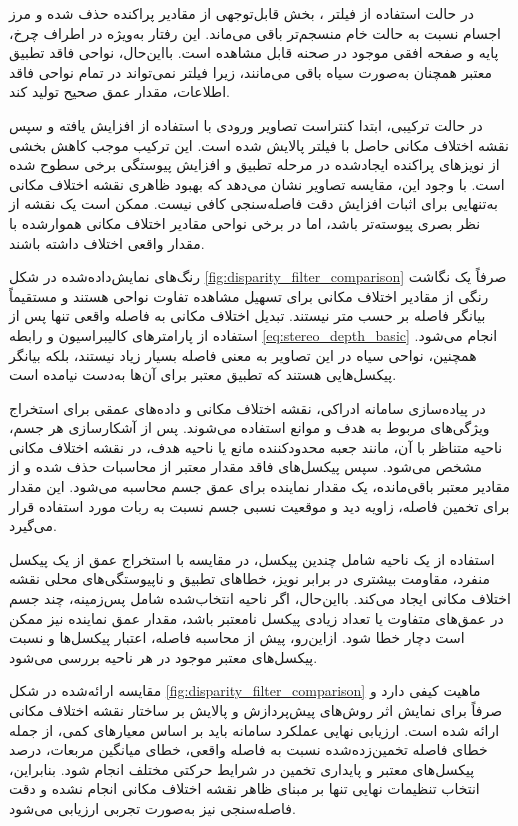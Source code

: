 در حالت استفاده از فیلتر ، بخش قابل‌توجهی از مقادیر
پراکنده حذف شده و مرز اجسام نسبت به حالت خام منسجم‌تر باقی می‌ماند.
این رفتار به‌ویژه در اطراف چرخ، پایه و صفحه افقی موجود در صحنه
قابل مشاهده است. بااین‌حال، نواحی فاقد تطبیق معتبر همچنان به‌صورت
سیاه باقی می‌مانند، زیرا فیلتر  نمی‌تواند در تمام نواحی
فاقد اطلاعات، مقدار عمق صحیح تولید کند.

در حالت ترکیبی، ابتدا کنتراست تصاویر ورودی با استفاده از
 افزایش یافته و سپس نقشه اختلاف مکانی حاصل با فیلتر
 پالایش شده است. این ترکیب موجب کاهش بخشی از نویزهای
پراکنده ایجادشده در مرحله تطبیق و افزایش پیوستگی برخی سطوح شده
است. با وجود این، مقایسه تصاویر نشان می‌دهد که بهبود ظاهری نقشه
اختلاف مکانی به‌تنهایی برای اثبات افزایش دقت فاصله‌سنجی کافی نیست.
ممکن است یک نقشه از نظر بصری پیوسته‌تر باشد، اما در برخی نواحی
مقادیر اختلاف مکانی هموارشده با مقدار واقعی اختلاف داشته باشند.

رنگ‌های نمایش‌داده‌شده در شکل
\ref{fig:disparity_filter_comparison} صرفاً یک نگاشت رنگی از مقادیر
اختلاف مکانی برای تسهیل مشاهده تفاوت نواحی هستند و مستقیماً بیانگر
فاصله بر حسب متر نیستند. تبدیل اختلاف مکانی به فاصله واقعی تنها پس
از استفاده از پارامترهای کالیبراسیون و رابطه
\ref{eq:stereo_depth_basic} انجام می‌شود. همچنین، نواحی سیاه در
این تصاویر به معنی فاصله بسیار زیاد نیستند، بلکه بیانگر پیکسل‌هایی
هستند که تطبیق معتبر برای آن‌ها به‌دست نیامده است.

در پیاده‌سازی سامانه ادراکی، نقشه اختلاف مکانی و داده‌های عمقی
برای استخراج ویژگی‌های مربوط به هدف و موانع استفاده می‌شوند. پس
از آشکارسازی هر جسم، ناحیه متناظر با آن، مانند جعبه محدودکننده
مانع یا ناحیه هدف، در نقشه اختلاف مکانی مشخص می‌شود. سپس پیکسل‌های
فاقد مقدار معتبر از محاسبات حذف شده و از مقادیر معتبر باقی‌مانده،
یک مقدار نماینده برای عمق جسم محاسبه می‌شود. این مقدار برای تخمین
فاصله، زاویه دید و موقعیت نسبی جسم نسبت به ربات مورد استفاده قرار
می‌گیرد.

استفاده از یک ناحیه شامل چندین پیکسل، در مقایسه با استخراج عمق از
یک پیکسل منفرد، مقاومت بیشتری در برابر نویز، خطاهای تطبیق و
ناپیوستگی‌های محلی نقشه اختلاف مکانی ایجاد می‌کند. بااین‌حال، اگر
ناحیه انتخاب‌شده شامل پس‌زمینه، چند جسم در عمق‌های متفاوت یا تعداد
زیادی پیکسل نامعتبر باشد، مقدار عمق نماینده نیز ممکن است دچار خطا
شود. ازاین‌رو، پیش از محاسبه فاصله، اعتبار پیکسل‌ها و نسبت پیکسل‌های
معتبر موجود در هر ناحیه بررسی می‌شود.

مقایسه ارائه‌شده در شکل \ref{fig:disparity_filter_comparison} ماهیت
کیفی دارد و صرفاً برای نمایش اثر روش‌های پیش‌پردازش و پالایش بر
ساختار نقشه اختلاف مکانی ارائه شده است. ارزیابی نهایی عملکرد
سامانه باید بر اساس معیارهای کمی، از جمله خطای فاصله تخمین‌زده‌شده
نسبت به فاصله واقعی، خطای میانگین مربعات، درصد پیکسل‌های معتبر و
پایداری تخمین در شرایط حرکتی مختلف انجام شود. بنابراین، انتخاب
تنظیمات نهایی تنها بر مبنای ظاهر نقشه اختلاف مکانی انجام نشده و
دقت فاصله‌سنجی نیز به‌صورت تجربی ارزیابی می‌شود.

